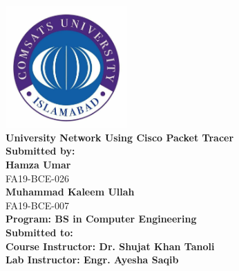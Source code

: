 
\begin{titlepage}
\begin{center}


\includegraphics[width=0.35\textwidth]{./logo}~\\[1.5cm]


{ \huge \bfseries University Network Using Cisco Packet Tracer} \\[1.4cm]

{ \large \bfseries Submitted by:} \\[0.2cm]
{ \large \bfseries Hamza Umar}  \\[0.1cm]
{ \small FA19-BCE-026} \\[0.2cm]
{ \large \bfseries Muhammad Kaleem Ullah}  \\[0.1cm]
{ \small FA19-BCE-007} \\[0.2cm]



{ \small \bfseries Program: BS in Computer Engineering} \\[0.2cm]


{ \large \bfseries Submitted to:} \\[0.1cm]
{ \small \bfseries  Course Instructor: Dr. Shujat Khan Tanoli} \\[0.2cm]
{ \small \bfseries  Lab Instructor: Engr. Ayesha Saqib} \\[1.0cm]




\end{center}
\end{titlepage}
